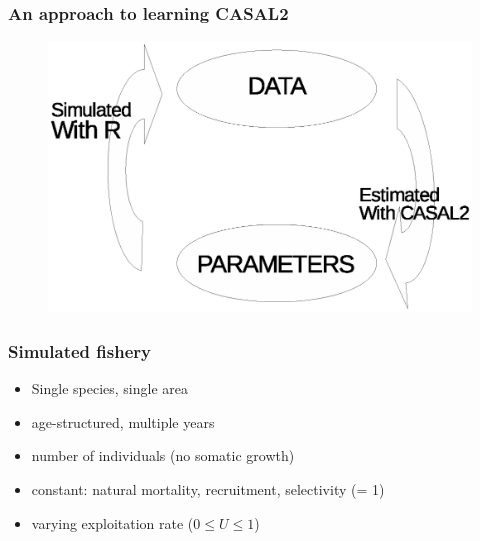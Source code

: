 \documentclass{beamer}
\begin{document}




\begin{frame}
\frametitle{An approach to learning CASAL2}

\begin{figure}
  \includegraphics[scale=0.8, angle=0]{diagram.eps}
  \end{figure}

\end{frame}


\begin{frame}
\frametitle{Simulated fishery}

\begin{itemize}
\item Single species, single area
\item age-structured, multiple years
\item number of individuals (no somatic growth)
\item constant: natural mortality, recruitment, selectivity (= 1)
\item varying exploitation rate ($0 \leq U \leq 1$)
\end{itemize}

\end{frame}
\end{document}
